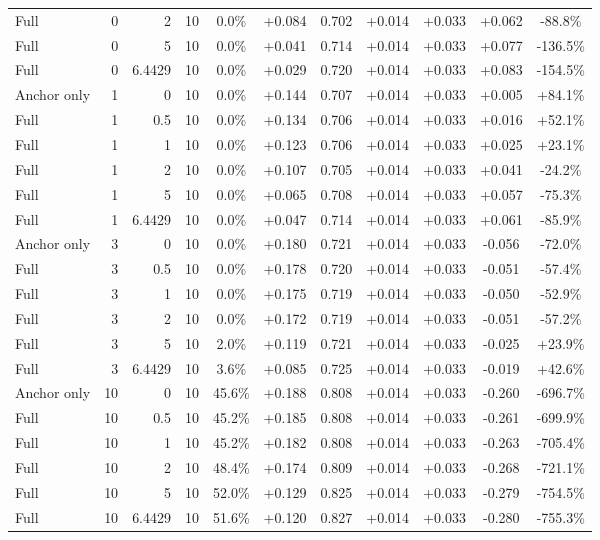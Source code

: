 \begin{table}[htbp]
\begin{tabular}{lrrrccccccc}
Full & 0 & 2 & 10 & 0.0\% & +0.084 & 0.702 & +0.014 & +0.033 & +0.062 & -88.8\% \\
Full & 0 & 5 & 10 & 0.0\% & +0.041 & 0.714 & +0.014 & +0.033 & +0.077 & -136.5\% \\
Full & 0 & 6.4429 & 10 & 0.0\% & +0.029 & 0.720 & +0.014 & +0.033 & +0.083 & -154.5\% \\
Anchor only & 1 & 0 & 10 & 0.0\% & +0.144 & 0.707 & +0.014 & +0.033 & +0.005 & +84.1\% \\
Full & 1 & 0.5 & 10 & 0.0\% & +0.134 & 0.706 & +0.014 & +0.033 & +0.016 & +52.1\% \\
Full & 1 & 1 & 10 & 0.0\% & +0.123 & 0.706 & +0.014 & +0.033 & +0.025 & +23.1\% \\
Full & 1 & 2 & 10 & 0.0\% & +0.107 & 0.705 & +0.014 & +0.033 & +0.041 & -24.2\% \\
Full & 1 & 5 & 10 & 0.0\% & +0.065 & 0.708 & +0.014 & +0.033 & +0.057 & -75.3\% \\
Full & 1 & 6.4429 & 10 & 0.0\% & +0.047 & 0.714 & +0.014 & +0.033 & +0.061 & -85.9\% \\
Anchor only & 3 & 0 & 10 & 0.0\% & +0.180 & 0.721 & +0.014 & +0.033 & -0.056 & -72.0\% \\
Full & 3 & 0.5 & 10 & 0.0\% & +0.178 & 0.720 & +0.014 & +0.033 & -0.051 & -57.4\% \\
Full & 3 & 1 & 10 & 0.0\% & +0.175 & 0.719 & +0.014 & +0.033 & -0.050 & -52.9\% \\
Full & 3 & 2 & 10 & 0.0\% & +0.172 & 0.719 & +0.014 & +0.033 & -0.051 & -57.2\% \\
Full & 3 & 5 & 10 & 2.0\% & +0.119 & 0.721 & +0.014 & +0.033 & -0.025 & +23.9\% \\
Full & 3 & 6.4429 & 10 & 3.6\% & +0.085 & 0.725 & +0.014 & +0.033 & -0.019 & +42.6\% \\
Anchor only & 10 & 0 & 10 & 45.6\% & +0.188 & 0.808 & +0.014 & +0.033 & -0.260 & -696.7\% \\
Full & 10 & 0.5 & 10 & 45.2\% & +0.185 & 0.808 & +0.014 & +0.033 & -0.261 & -699.9\% \\
Full & 10 & 1 & 10 & 45.2\% & +0.182 & 0.808 & +0.014 & +0.033 & -0.263 & -705.4\% \\
Full & 10 & 2 & 10 & 48.4\% & +0.174 & 0.809 & +0.014 & +0.033 & -0.268 & -721.1\% \\
Full & 10 & 5 & 10 & 52.0\% & +0.129 & 0.825 & +0.014 & +0.033 & -0.279 & -754.5\% \\
Full & 10 & 6.4429 & 10 & 51.6\% & +0.120 & 0.827 & +0.014 & +0.033 & -0.280 & -755.3\% \\

\end{tabular}
\end{table}
